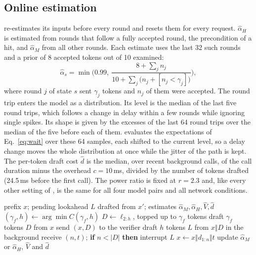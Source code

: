 \subsection{Online estimation}
\cape{} re-estimates its inputs before every round and resets them for every request. $\hat\alpha_H$ is estimated from rounds that follow a fully accepted round, the precondition of a hit, and $\hat\alpha_M$ from all other rounds. Each estimate uses the last 32 such rounds and a prior of 8 accepted tokens out of 10 examined:
\begin{equation}
\hat\alpha_s=\min\Big(0.99,\ \frac{8+\sum_j n_j}{10+\sum_j \big(n_j+[n_j<\gamma_j]\big)}\Big),
\end{equation}
where round $j$ of state $s$ sent $\gamma_j$ tokens and $n_j$ of them were accepted. The round trip enters the model as a distribution. Its level is the median of the last five round trips, which follows a change in delay within a few rounds while ignoring single spikes. Its shape is given by the excesses of the last 64 round trips over the median of the five before each of them. \cape{} evaluates the expectations of Eq.~\eqref{eq:wait} over these 64 samples, each shifted to the current level, so a delay change moves the whole distribution at once while the jitter of the path is kept. The per-token draft cost $\hat d$ is the median, over recent background calls, of the call duration minus the overhead $c=10$\,ms, divided by the number of tokens drafted (24.5\,ms before the first call). The power ratio is fixed at $r=2.3$ and, like every other setting of \cape{}, is the same for all four model pairs and all network conditions.

\begin{algorithm}[t]
\caption{One \cape{} round on the device}
\label{alg:cape}
\begin{algorithmic}[1]
\Require prefix $x$; pending lookahead $L$ drafted from $x'$; estimates $\hat\alpha_M,\hat\alpha_H,\hat V,\hat d$
\State $(\gamma_f,h)\gets\arg\min C(\gamma_f,h)$ 
 
  \State $D\gets\ell_{2:h}$, topped up to $\gamma_f$ tokens
\Else {}
  \State draft $\gamma_f$ tokens $D$ from $x$ 
\EndIf
\State send $(x,D)$ to the verifier
\State draft $h$ tokens $L$ from $x\Vert D$ in the background
\State receive $(n,t)$; \textbf{if} $n<|D|$ \textbf{then} interrupt $L$
\State $x\gets x\Vert d_{1:n}\Vert t$
\State update $\hat\alpha_M$ or $\hat\alpha_H$, $\hat V$ and $\hat d$
\end{algorithmic}
\end{algorithm}

